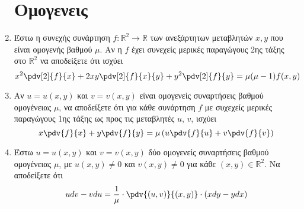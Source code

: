 \begin{enumerate}





     \section{Ομογενεις}

 \item Έστω η συνεχής συνάρτηση $ f : \mathbb{R}^{2} \to \mathbb{R} $ των ανεξάρτητων μεταβλητών $
	 x,y $ που είναι ομογενής βαθμού $ \mu $. Αν η $f$ έχει συνεχείς μερικές παραγώγους 2ης τάξης
	 στο $ \mathbb{R}^{2} $ να αποδείξετε ότι ισχύει 
	 \[
		 x^{2}\pdv[2]{f}{x} + 2xy\pdv[2]{f}{x}{y} + y^{2}\pdv[2]{f}{y} = \mu(\mu -1)f(x,y)
	 \] 

 \item Αν $ u = u(x,y) $ και $ v = v(x,y) $ είναι ομογενείς συναρτήσεις βαθμού ομογένειας $\mu$, να
	 αποδείξετε ότι για κάθε συνάρτηση $f$ με συχεχείς μερικές παραγώγους 1ης τάξης ως προς τις
	 μεταβλητές $u$, $v$, ισχύει
	 \[
		 x\pdv{f}{x} + y\pdv{f}{y} = \mu \left(u\pdv{f}{u} + v\pdv{f}{v}\right) 
	 \] 

 \item  Έστω $ u = u(x,y) $ και $ v = v(x,y) $ δύο ομογενείς συναρτήσεις βαθμού ομογένειας $\mu$, με
	 $u(x,y)\neq 0$ και $ v(x,y)\neq 0 $ για κάθε $(x,y) \in \mathbb{R}^{2} $. Να αποδείξετε ότι
	 \[
		 udv - vdu = \frac{ 1 }{ \mu } \cdot \pdv{(u,v)}{(x,y)}\cdot(xdy-ydx) 
	 \] 













\end{enumerate}



